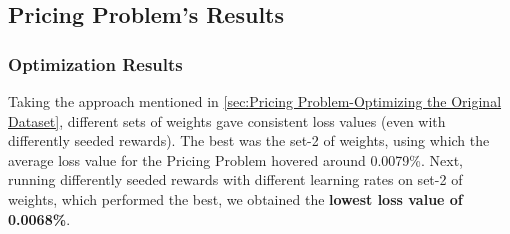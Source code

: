 \documentclass[12pt]{article}
\begin{document}
    \subsection{Pricing Problem's Results} \label{sec:Pricing Problem's Results}
    \subsubsection{Optimization Results} \label{sec:PriProbRes - Optimization}
    Taking the approach mentioned in \cref{sec:Pricing Problem-Optimizing the Original Dataset}, different sets of weights gave consistent loss values (even with differently seeded rewards). The best was the set-2 of weights, using which the average loss value for the Pricing Problem hovered around 0.0079\%. Next, running differently seeded rewards with different learning rates on set-2 of weights, which performed the best, we obtained the \textbf{lowest loss value of 0.0068\%}.
\end{document}
